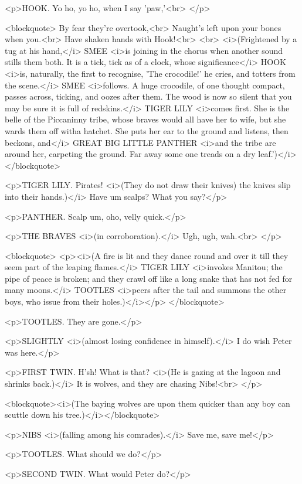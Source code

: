 <p>HOOK. Yo ho, yo ho, when I say 'paw,'<br>
</p>

<blockquote>       By fear they're overtook,<br>
       Naught's left upon your bones when you.<br>
       Have shaken hands with Hook!<br>
<br>
 <i>(Frightened by a tug at his hand,</i> SMEE <i>is joining in the
chorus when another sound stills them both. It is a tick, tick as of
a clock, whose significance</i> HOOK <i>is, naturally, the first to
recognise, 'The crocodile!' he cries, and totters from the scene.</i>
SMEE <i>follows. A huge crocodile, of one thought compact, passes
across, ticking, and oozes after them. The wood is now so silent that
you may be sure it is full of redskins.</i> TIGER LILY <i>comes
first. She is the belle of the Piccaninny tribe, whose braves would
all have her to wife, but she wards them off witha hatchet. She puts
her ear to the ground and listens, then beckons, and</i> GREAT BIG
LITTLE PANTHER <i>and the tribe are around her, carpeting the ground.
Far away some one treads on a dry leaf.')</i></blockquote>

<p>TIGER LILY. Pirates! <i>(They do not draw their knives) the knives
slip into their hands.)</i> Have um scalps? What you say?</p>

<p>PANTHER. Scalp um, oho, velly quick.</p>

<p>THE BRAVES <i>(in corroboration).</i> Ugh, ugh, wah.<br>
</p>

<blockquote>
<p><i>(A fire is lit and they dance round and over it till they seem
part of the leaping flames.</i> TIGER LILY <i>invokes Manitou; the
pipe of peace is broken; and they crawl off like a long snake that
has not fed for many moons.</i> TOOTLES <i>peers after the tail and
summons the other boys, who issue from their holes.)</i></p>
</blockquote>

<p>TOOTLES. They are gone.</p>

<p>SLIGHTLY <i>(almost losing confidence in himself).</i> I do wish
Peter was here.</p>

<p>FIRST TWIN. H'sh! What is that? <i>(He is gazing at the lagoon and
shrinks back.)</i> It is wolves, and they are chasing Nibs!<br>
</p>

<blockquote><i>(The baying wolves are upon them quicker than any boy
can scuttle down his tree.)</i></blockquote>

<p>NIBS <i>(falling among his comrades).</i> Save me, save me!</p>

<p>TOOTLES. What should we do?</p>

<p>SECOND TWIN. What would Peter do?</p>

